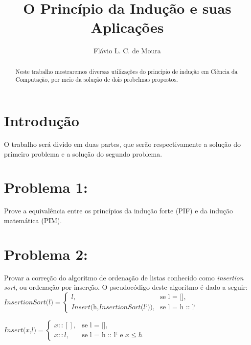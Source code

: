 \documentclass[a4paper, 10pt]{article}
\title{\LARGE \bf
O Princípio da Indução e suas Aplicações
}
\author{Flávio L. C. de Moura}
\begin{document}
\maketitle

\begin{abstract}

Neste trabalho mostraremos diversas utilizações do princípio de indução em Ciência da Computação, por meio da solução de dois probelmas propostos.

\end{abstract}

\section{Introdução}

O trabalho será divido em duas partes, que serão respectivamente a solução do primeiro problema e a solução do segundo problema. 

\section{Problema 1:}

Prove a equivalência entre os princípios da indução forte (PIF) e da indução matemática (PIM).



\section{Problema 2:}

Provar a correção do algoritmo de ordenação de listas conhecido como \textit {insertion sort}, ou ordenação por inserção.
O pseudocódigo deste algoritmo é dado a seguir:\\

$\textit{InsertionSort(l)}=\begin{cases}
l,& \text{se l = []},\\
\textit{Insert(h,InsertionSort(l`))},& \text{se l = h :: l`}
\end{cases}$

$\textit{Insert(x,l)}=\begin{cases}
x :: [],& \text{se l = []},\\
x ::l,& \text{se l = h :: l` e $x \leq h$}
\end{cases}$
\end{document}
